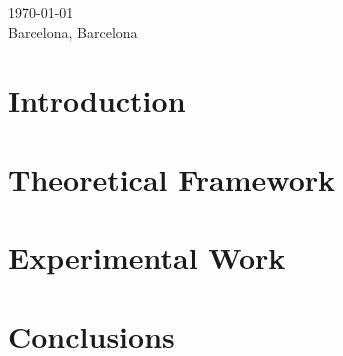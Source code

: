 \documentclass[a4paper,12pt,arial,numbered,print,index,oneside]{book}
\newcommand\blankpage{%
	\null
	\thispagestyle{empty}%
	\addtocounter{page}{-1}%
	\newpage}
\let\LaTeXStandardTableOfContents\tableofcontents
\renewcommand{\tableofcontents}{%
	\begingroup%
	\renewcommand{\bfseries}{\relax}%
	\LaTeXStandardTableOfContents%
	\endgroup%
}%
\begin{document}
\begin{titlepage}
		
		\vspace{.5cm}
		
		
		{\large \today} \\
		\large Barcelona, Barcelona  
		
		
		\vfill %
		
	\end{titlepage}

	
	\onehalfspacing
	\setlength{\parskip}{0.5cm plus4mm minus3mm}
	\afterpage{\blankpage}
	
	\tableofcontents
	
	\clearpage
	
	\thispagestyle{plain}
	
	\chapter{Introduction}
	\label{chap:intro}
	
	
	\chapter{Theoretical Framework}
	\label{chap:theoretical_framework}
	
	
	\chapter{Experimental Work}
	\label{chap:experimental_work}
	

	
	\chapter{Conclusions}
	\label{chap:conclusions}
	

	
	
	
	
	\printglossaries
	
	\begin{appendices}
		
	\end{appendices}
	
	
\end{document}
